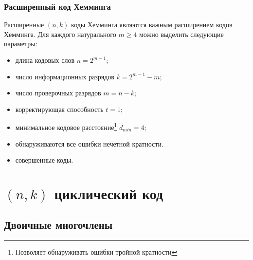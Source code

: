 \begin{frame}
    \frametitle{Расширенный код Хемминга}
    Расширенные $(n,k)$ коды Хемминга являются важным расширением кодов Хемминга. Для каждого натурального $m\geq 4$ можно выделить следующие параметры:
    
    \begin{itemize}
        \item длина кодовых слов $n = 2^{m-1}$;
        \item число информационных разрядов $k = 2^{m-1} - m$;
        \item число проверочных разрядов $m = n - k$;
        \item корректирующая способность $t=1$;
        \item минимальное кодовое расстояние\footnote{Позволяет обнаруживать ошибки тройной кратности} $d_{min}=4$;
        \item обнаруживаются все ошибки нечетной кратности.
        \item \alert{совершенные коды}.
    \end{itemize}
\end{frame}


\section{$(n,k)$ циклический код}


\subsection{Двоичные многочлены}


